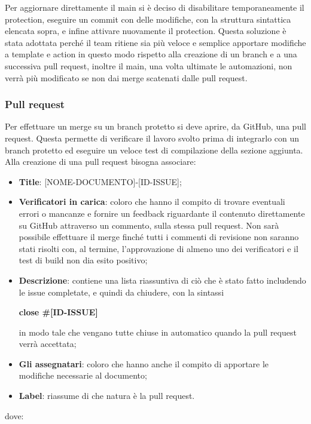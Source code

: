 Per aggiornare direttamente il main si è deciso di disabilitare temporaneamente
il protection, eseguire un commit con delle modifiche, con la struttura
sintattica elencata sopra, e infine attivare nuovamente il protection. Questa
soluzione è stata adottata perché il team ritiene sia più veloce e semplice
apportare modifiche a template e action in questo modo rispetto alla creazione
di un branch e a una successiva pull request, inoltre il main, una volta
ultimate le automazioni, non verrà più modificato se non dai merge scatenati
dalle pull request.

\subsubsection{Pull request}\label{inf:pr}
Per effettuare un merge su un branch protetto si deve aprire, da GitHub, una
pull request. Questa permette di verificare il lavoro svolto prima di
integrarlo con un branch protetto ed eseguire un veloce test di compilazione
della sezione aggiunta. Alla creazione di una pull request bisogna associare:
\begin{itemize}
      \item \textbf{Title}: [NOME-DOCUMENTO]-[ID-ISSUE];
      \item \textbf{Verificatori in carica}: coloro che hanno il compito di trovare eventuali errori o mancanze e fornire un feedback
            riguardante il contenuto direttamente su GitHub attraverso un commento, sulla stessa pull request.
            Non sarà possibile effettuare il merge finché tutti i commenti di revisione non saranno stati risolti
            con, al termine, l'approvazione di almeno uno dei verificatori e il test di build non dia esito positivo;
      \item \textbf{Descrizione}: contiene una lista riassuntiva di ciò che è stato fatto includendo le issue completate, e quindi da chiudere,
            con la sintassi
            \begin{center}
                  \textbf{close \#[ID-ISSUE]}
            \end{center}
            in modo tale che vengano tutte chiuse in automatico quando la pull request verrà accettata;
      \item \textbf{Gli assegnatari}: coloro che hanno anche il compito di apportare le modifiche necessarie al documento;
      \item \textbf{Label}: riassume di che natura è la pull request.
\end{itemize}
dove:

